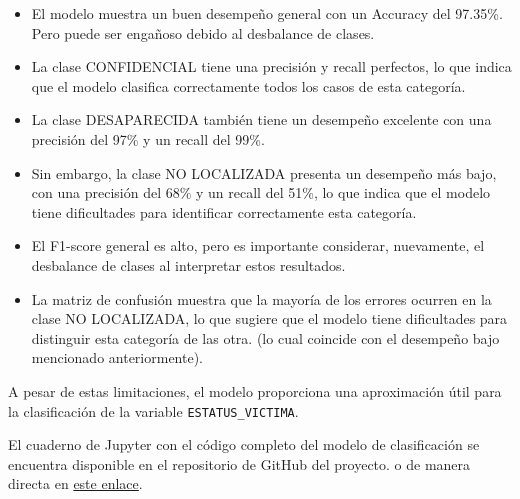  \begin{itemize}
        \item El modelo muestra un buen desempeño general con un Accuracy del 97.35\%. Pero puede ser engañoso debido al desbalance de clases.
        \item La clase CONFIDENCIAL tiene una precisión y recall perfectos, lo que indica que el modelo clasifica correctamente todos los casos de esta categoría.
        \item La clase DESAPARECIDA también tiene un desempeño excelente con una precisión del 97\% y un recall del 99\%.
        \item Sin embargo, la clase NO LOCALIZADA presenta un desempeño más bajo, con una precisión del 68\% y un recall del 51\%, lo que indica que el modelo tiene
        dificultades para identificar correctamente esta categoría.
        \item El F1-score general es alto, pero es importante considerar, nuevamente, el desbalance de clases al interpretar estos resultados.
        \item La matriz de confusión muestra que la mayoría de los errores ocurren en la clase NO LOCALIZADA, lo que sugiere que el modelo tiene
        dificultades para distinguir esta categoría de las otra. (lo cual coincide con el desempeño bajo mencionado anteriormente).
 \end{itemize}

 A pesar de estas limitaciones, el modelo proporciona una aproximación útil para la clasificación de la variable \texttt{ESTATUS\_VICTIMA}.

\begin{tcolorbox}[title=Nota]
El cuaderno de Jupyter con el código completo del modelo de clasificación se encuentra disponible en el repositorio de GitHub del proyecto.
o de manera directa en \href{https://github.com/wallsified/AyMdD_2026-2/blob/main/Tarea%203/Tarea3.ipynb}{este enlace}.
\end{tcolorbox}